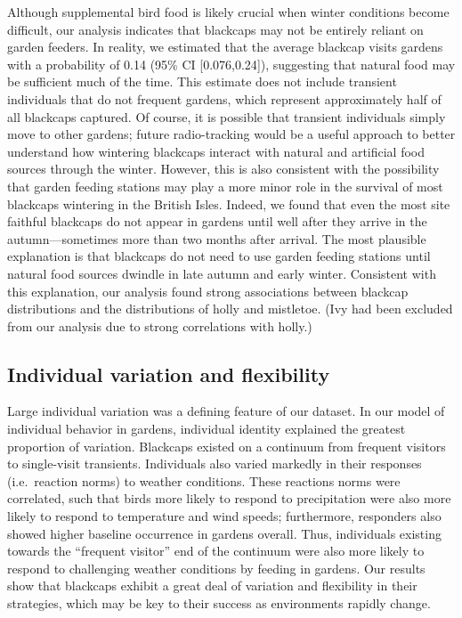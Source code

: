 \documentclass[a4paper, twoside]{templates/ociamthesis}
\begin{document}
Although supplemental bird food is likely crucial when winter conditions become difficult, our analysis indicates that blackcaps may not be entirely reliant on garden feeders. In reality, we estimated that the average blackcap visits gardens with a probability of 0.14 (95\% CI {[}0.076,0.24{]}), suggesting that natural food may be sufficient much of the time. This estimate does not include transient individuals that do not frequent gardens, which represent approximately half of all blackcaps captured. Of course, it is possible that transient individuals simply move to other gardens; future radio-tracking would be a useful approach to better understand how wintering blackcaps interact with natural and artificial food sources through the winter. However, this is also consistent with the possibility that garden feeding stations may play a more minor role in the survival of most blackcaps wintering in the British Isles. Indeed, we found that even the most site faithful blackcaps do not appear in gardens until well after they arrive in the autumn---sometimes more than two months after arrival. The most plausible explanation is that blackcaps do not need to use garden feeding stations until natural food sources dwindle in late autumn and early winter. Consistent with this explanation, our analysis found strong associations between blackcap distributions and the distributions of holly and mistletoe. (Ivy had been excluded from our analysis due to strong correlations with holly.)

\hypertarget{individual-variation-and-flexibility}{%
\subsection{Individual variation and flexibility}\label{individual-variation-and-flexibility}}

Large individual variation was a defining feature of our dataset. In our model of individual behavior in gardens, individual identity explained the greatest proportion of variation. Blackcaps existed on a continuum from frequent visitors to single-visit transients. Individuals also varied markedly in their responses (i.e.~reaction norms) to weather conditions. These reactions norms were correlated, such that birds more likely to respond to precipitation were also more likely to respond to temperature and wind speeds; furthermore, responders also showed higher baseline occurrence in gardens overall. Thus, individuals existing towards the ``frequent visitor'' end of the continuum were also more likely to respond to challenging weather conditions by feeding in gardens. Our results show that blackcaps exhibit a great deal of variation and flexibility in their strategies, which may be key to their success as environments rapidly change.
\end{document}
